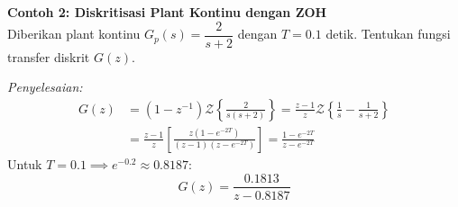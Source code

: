 \documentclass[11pt,a4paper]{article}
\begin{document}
\vspace{10pt}

\noindent\textbf{Contoh 2: Diskritisasi Plant Kontinu dengan ZOH}\\
Diberikan plant kontinu $G_p(s) = \dfrac{2}{s + 2}$ dengan $T = 0.1$ detik. Tentukan fungsi transfer diskrit $G(z)$.

\textit{Penyelesaian:}
\begin{align*}
    G(z) &= (1 - z^{-1}) \mathcal{Z}\left\{ \frac{2}{s(s+2)} \right\} = \frac{z - 1}{z} \mathcal{Z}\left\{ \frac{1}{s} - \frac{1}{s+2} \right\} \\
    &= \frac{z - 1}{z} \left[ \frac{z(1 - e^{-2T})}{(z - 1)(z - e^{-2T})} \right] = \frac{1 - e^{-2T}}{z - e^{-2T}}
\end{align*}
Untuk $T = 0.1 \implies e^{-0.2} \approx 0.8187$:
\begin{equation*}
    G(z) = \frac{0.1813}{z - 0.8187}
\end{equation*}
\end{document}
